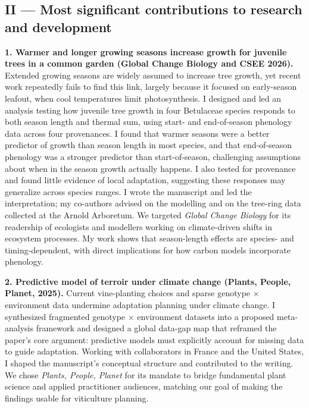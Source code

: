 \documentclass[12pt]{article}
\begin{document}
\subsection*{II --- Most significant contributions to research and development}
\textbf{1. Warmer and longer growing seasons increase growth for juvenile trees in a common garden (Global Change Biology and CSEE 2026).}
Extended growing seasons are widely assumed to increase tree growth, yet recent work repeatedly fails to find this link, largely because it focused on early-season leafout, when cool temperatures limit photosynthesis. I designed and led an analysis testing how juvenile tree growth in four Betulaceae species responds to both season length and thermal sum, using start- and end-of-season phenology data across four provenances. I found that warmer seasons were a better predictor of growth than season length in most species, and that end-of-season phenology was a stronger predictor than start-of-season, challenging assumptions about when in the season growth actually happens. I also tested for provenance and found little evidence of local adaptation, suggesting these responses may generalize across species ranges. I wrote the manuscript and led the interpretation; my co-authors advised on the modelling and on the tree-ring data collected at the Arnold Arboretum. We targeted \textit{Global Change Biology} for its readership of ecologists and modellers working on climate-driven shifts in ecosystem processes. My work shows that season-length effects are species- and timing-dependent, with direct implications for how carbon models incorporate phenology.

\textbf{2. Predictive model of terroir under climate change (Plants, People, Planet, 2025).}
Current vine-planting choices and sparse genotype $\times$ environment data undermine adaptation planning under climate change. I synthesized fragmented genotype $\times$ environment datasets into a proposed meta-analysis framework and designed a global data-gap map that reframed the paper's core argument: predictive models must explicitly account for missing data to guide adaptation. Working with collaborators in France and the United States, I shaped the manuscript's conceptual structure and contributed to the writing. We chose \textit{Plants, People, Planet} for its mandate to bridge fundamental plant science and applied practitioner audiences, matching our goal of making the findings usable for viticulture planning.
\end{document}
